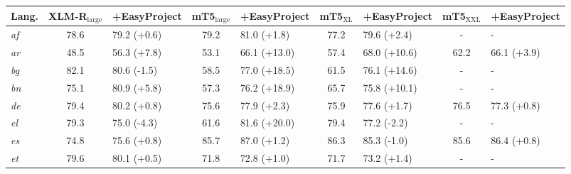 \documentclass[11pt,dvipsnames]{article}
\begin{document}
\renewcommand{\arraystretch}{1.2}
\begin{table*}[ht!]
\centering
\scriptsize
\begin{tabular}{lcccccccccccc}
\toprule
Lang. & XLM-R$_{\text{large}}$ & \multicolumn{2}{c}{+EasyProject} & mT5$_{\text{large}}$ & \multicolumn{2}{c}{+EasyProject} & mT5$_{\text{XL}}$ & \multicolumn{2}{c}{+EasyProject} & mT5$_{\text{XXL}}$ & \multicolumn{2}{c}{+EasyProject}\\
\midrule\textit{af}&78.6&\multicolumn{2}{l}{\cellcolor[HTML]{E9F7EF} 79.2 (+0.6)}&79.2&\multicolumn{2}{l}{\cellcolor[HTML]{A9DFBF} 81.0 (+1.8)}&77.2&\multicolumn{2}{l}{\cellcolor[HTML]{A9DFBF} 79.6 (+2.4)}&-&\multicolumn{2}{l}{-}\\
\textit{ar}&48.5&\multicolumn{2}{l}{\cellcolor[HTML]{7DCEA0} 56.3 (+7.8)}&53.1&\multicolumn{2}{l}{\cellcolor[HTML]{52BE80} 66.1 (+13.0)}&57.4&\multicolumn{2}{l}{\cellcolor[HTML]{52BE80} 68.0 (+10.6)}&62.2&\multicolumn{2}{l}{\cellcolor[HTML]{A9DFBF} 66.1 (+3.9)}\\
\textit{bg}&82.1&\multicolumn{2}{l}{\cellcolor[HTML]{FADBD8} 80.6 (-1.5)}&58.5&\multicolumn{2}{l}{\cellcolor[HTML]{52BE80} 77.0 (+18.5)}&61.5&\multicolumn{2}{l}{\cellcolor[HTML]{52BE80} 76.1 (+14.6)}&-&\multicolumn{2}{l}{-}\\
\textit{bn}&75.1&\multicolumn{2}{l}{\cellcolor[HTML]{7DCEA0} 80.9 (+5.8)}&57.3&\multicolumn{2}{l}{\cellcolor[HTML]{52BE80} 76.2 (+18.9)}&65.7&\multicolumn{2}{l}{\cellcolor[HTML]{52BE80} 75.8 (+10.1)}&-&\multicolumn{2}{l}{-}\\
\textit{de}&79.4&\multicolumn{2}{l}{\cellcolor[HTML]{E9F7EF} 80.2 (+0.8)}&75.6&\multicolumn{2}{l}{\cellcolor[HTML]{A9DFBF} 77.9 (+2.3)}&75.9&\multicolumn{2}{l}{\cellcolor[HTML]{A9DFBF} 77.6 (+1.7)}&76.5&\multicolumn{2}{l}{\cellcolor[HTML]{E9F7EF} 77.3 (+0.8)}\\
\textit{el}&79.3&\multicolumn{2}{l}{\cellcolor[HTML]{FADBD8} 75.0 (-4.3)}&61.6&\multicolumn{2}{l}{\cellcolor[HTML]{52BE80} 81.6 (+20.0)}&79.4&\multicolumn{2}{l}{\cellcolor[HTML]{FADBD8} 77.2 (-2.2)}&-&\multicolumn{2}{l}{-}\\
\textit{es}&74.8&\multicolumn{2}{l}{\cellcolor[HTML]{E9F7EF} 75.6 (+0.8)}&85.7&\multicolumn{2}{l}{\cellcolor[HTML]{A9DFBF} 87.0 (+1.2)}&86.3&\multicolumn{2}{l}{\cellcolor[HTML]{FADBD8} 85.3 (-1.0)}&85.6&\multicolumn{2}{l}{\cellcolor[HTML]{E9F7EF} 86.4 (+0.8)}\\
\textit{et}&79.6&\multicolumn{2}{l}{\cellcolor[HTML]{E9F7EF} 80.1 (+0.5)}&71.8&\multicolumn{2}{l}{\cellcolor[HTML]{A9DFBF} 72.8 (+1.0)}&71.7&\multicolumn{2}{l}{\cellcolor[HTML]{A9DFBF} 73.2 (+1.4)}&-&\multicolumn{2}{l}{-}\\

\end{tabular}
\end{table*}
\end{document}

